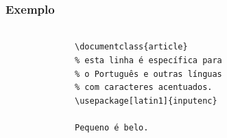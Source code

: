 \begin{frame}[fragile]
\frametitle{Exemplo}
\framesubtitle{}
  \scriptsize
  \begin{columns}[c]
  \begin{figure}[h!]
  \centering
  \setlength\fboxsep{0pt}
  \setlength\fboxrule{0.5pt}
  \label{fig:minimal}
  \end{figure}
  \begin{verbatim}
\documentclass{article}
% esta linha é específica para
% o Português e outras línguas
% com caracteres acentuados.
\usepackage[latin1]{inputenc}

Pequeno é belo.

\end{verbatim}
  \end{columns}
\end{frame}

